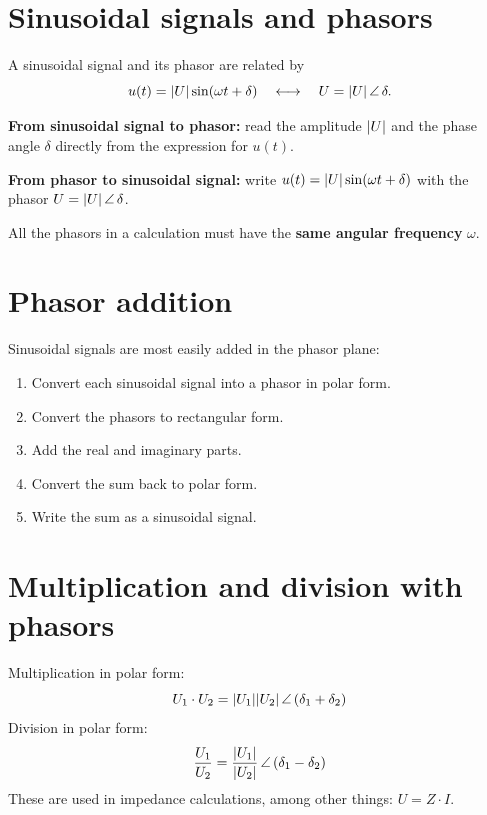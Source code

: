 
\section{Sinusoidal signals and phasors}
\label{c17:sec:fasorer}
A sinusoidal signal and its phasor are related by
\[
  u(t) = \lvert U\rvert\sin(\omega t + \delta) \quad \longleftrightarrow \quad U = \lvert U\rvert\,\angle\,\delta.
\]

\textbf{From sinusoidal signal to phasor:} read the amplitude $\lvert U\rvert$ and the phase angle
$\delta$ directly from the expression for $u(t)$.

\textbf{From phasor to sinusoidal signal:} write $u(t) = \lvert U\rvert\sin(\omega t + \delta)$ with the
phasor $U = \lvert U\rvert\,\angle\,\delta$.

\begin{aside}
\note[Note] All the phasors in a calculation must have the \textbf{same angular frequency}
$\omega$.
\end{aside}

\section{Phasor addition}
\label{c17:sec:fasoraddition}
Sinusoidal signals are most easily added in the phasor plane:
\begin{enumerate}
  \item Convert each sinusoidal signal into a phasor in polar form.
  \item Convert the phasors to rectangular form.
  \item Add the real and imaginary parts.
  \item Convert the sum back to polar form.
  \item Write the sum as a sinusoidal signal.
\end{enumerate}

\section{Multiplication and division with phasors}
\label{c17:sec:multiplikation}
Multiplication in polar form:
\[
  U_1 \cdot U_2 = \lvert U_1\rvert\lvert U_2\rvert\,\angle\,(\delta_1 + \delta_2)
\]
Division in polar form:
\[
  \frac{U_1}{U_2} = \frac{\lvert U_1\rvert}{\lvert U_2\rvert}\,\angle\,(\delta_1 - \delta_2)
\]
These are used in impedance calculations, among other things: $U = Z \cdot I$.

